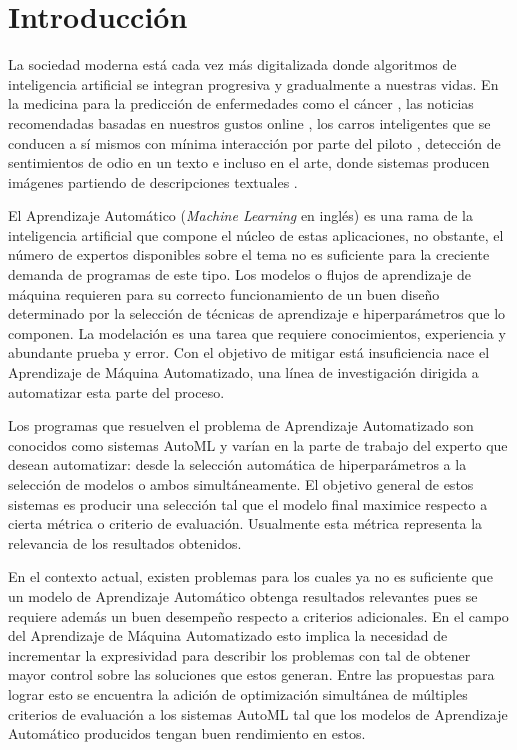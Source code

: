 \chapter*{Introducción}\label{chapter:introduction}
La sociedad moderna est\'a cada vez m\'as digitalizada donde algoritmos de inteligencia artificial se integran progresiva y gradualmente a nuestras vidas. En la medicina para la predicci\'on de enfermedades como el c\'ancer , las noticias  recomendadas basadas en nuestros gustos online , los carros inteligentes que se conducen a s\'i mismos con m\'inima interacci\'on por parte del piloto , detecci\'on de sentimientos de odio en un texto  e incluso en el arte, donde sistemas producen im\'agenes partiendo de descripciones textuales .

El Aprendizaje Autom\'atico (\textit{Machine Learning} en ingl\'es) es una rama de la inteligencia artificial que compone el n\'ucleo de estas aplicaciones, no obstante, el n\'umero de expertos disponibles sobre el tema no es suficiente para la creciente demanda de programas de este tipo. Los modelos o flujos de aprendizaje de m\'aquina requieren para su correcto funcionamiento de un buen dise\~no determinado por la selecci\'on de t\'ecnicas de aprendizaje e hiperpar\'ametros que lo componen. 
La modelaci\'on  es una tarea que requiere conocimientos, experiencia y abundante prueba y error.
Con el objetivo de mitigar est\'a insuficiencia nace el Aprendizaje de M\'aquina Automatizado, una l\'inea de investigaci\'on dirigida a automatizar esta parte del proceso.

Los programas que resuelven el problema de Aprendizaje Automatizado son conocidos como sistemas AutoML y var\'ian en la parte de trabajo del experto que desean automatizar: desde la selecci\'on autom\'atica de hiperpar\'ametros  a la selecci\'on de modelos  o ambos  simult\'aneamente. El objetivo general de estos sistemas es producir una selecci\'on tal que el modelo final maximice  respecto a cierta m\'etrica o criterio de evaluaci\'on. 
Usualmente esta m\'etrica representa la relevancia de los resultados obtenidos.

En el contexto actual, existen problemas para los cuales ya no es suficiente que un modelo de Aprendizaje Autom\'atico obtenga resultados relevantes pues se requiere adem\'as un buen desempe\~no respecto a criterios adicionales. En el campo del Aprendizaje de M\'aquina Automatizado esto implica la necesidad de incrementar la expresividad para describir los problemas con tal de obtener mayor control sobre las soluciones que estos generan. Entre las propuestas para lograr esto se encuentra la adici\'on de optimizaci\'on simult\'anea de m\'ultiples criterios de evaluaci\'on a los sistemas AutoML  tal que los modelos de Aprendizaje Autom\'atico producidos tengan buen rendimiento en estos.   

